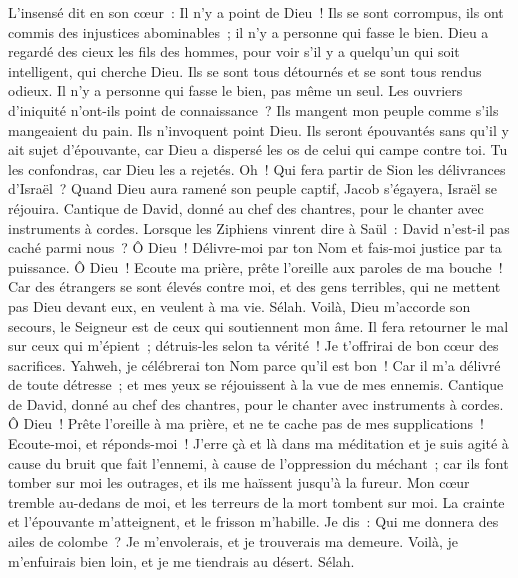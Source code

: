 \begin{multicols}{2}
L'insensé dit en son cœur~: Il n'y a point de Dieu~! Ils se sont corrompus, ils ont commis des injustices abominables~; il n'y a personne qui fasse le bien.
Dieu a regardé des cieux les fils des hommes, pour voir s'il y a quelqu'un qui soit intelligent, qui cherche Dieu.
Ils se sont tous détournés et se sont tous rendus odieux. Il n'y a personne qui fasse le bien, pas même un seul.
Les ouvriers d'iniquité n'ont-ils point de connaissance~? Ils mangent mon peuple comme s'ils mangeaient du pain. Ils n'invoquent point Dieu.
Ils seront épouvantés sans qu'il y ait sujet d'épouvante, car Dieu a dispersé les os de celui qui campe contre toi. Tu les confondras, car Dieu les a rejetés.
Oh~! Qui fera partir de Sion les délivrances d'Israël~? Quand Dieu aura ramené son peuple captif, Jacob s'égayera, Israël se réjouira.
\VerseOne{}Cantique de David, donné au chef des chantres, pour le chanter avec instruments à cordes.
Lorsque les Ziphiens vinrent dire à Saül~: David n'est-il pas caché parmi nous~?
Ô Dieu~! Délivre-moi par ton Nom et fais-moi justice par ta puissance.
Ô Dieu~! Ecoute ma prière, prête l'oreille aux paroles de ma bouche~!
Car des étrangers se sont élevés contre moi, et des gens terribles, qui ne mettent pas Dieu devant eux, en veulent à ma vie. Sélah.
Voilà, Dieu m'accorde son secours, le Seigneur est de ceux qui soutiennent mon âme.
Il fera retourner le mal sur ceux qui m'épient~; détruis-les selon ta vérité~!
Je t'offrirai de bon cœur des sacrifices. Yahweh, je célébrerai ton Nom parce qu'il est bon~!
Car il m'a délivré de toute détresse~; et mes yeux se réjouissent à la vue de mes ennemis.
\VerseOne{}Cantique de David, donné au chef des chantres, pour le chanter avec instruments à cordes.
Ô Dieu~! Prête l'oreille à ma prière, et ne te cache pas de mes supplications~!
Ecoute-moi, et réponds-moi~! J'erre çà et là dans ma méditation et je suis agité
à cause du bruit que fait l'ennemi, à cause de l'oppression du méchant~; car ils font tomber sur moi les outrages, et ils me haïssent jusqu'à la fureur.
Mon cœur tremble au-dedans de moi, et les terreurs de la mort tombent sur moi.
La crainte et l'épouvante m'atteignent, et le frisson m'habille.
Je dis~: Qui me donnera des ailes de colombe~? Je m'envolerais, et je trouverais ma demeure.
Voilà, je m'enfuirais bien loin, et je me tiendrais au désert. Sélah.

\end{multicols}
